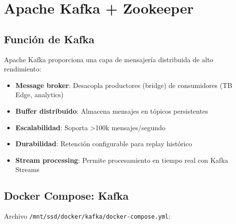 \section{Apache Kafka + Zookeeper}

\subsection{Función de Kafka}

Apache Kafka proporciona una capa de mensajería distribuida de alto rendimiento:

\begin{itemize}
    \item \textbf{Message broker}: Desacopla productores (bridge) de consumidores (TB Edge, analytics)
    \item \textbf{Buffer distribuido}: Almacena mensajes en tópicos persistentes
    \item \textbf{Escalabilidad}: Soporta >100k mensajes/segundo
    \item \textbf{Durabilidad}: Retención configurable para replay histórico
    \item \textbf{Stream processing}: Permite procesamiento en tiempo real con Kafka Streams
\end{itemize}

\subsection{Docker Compose: Kafka}

Archivo \texttt{/mnt/ssd/docker/kafka/docker-compose.yml}:

